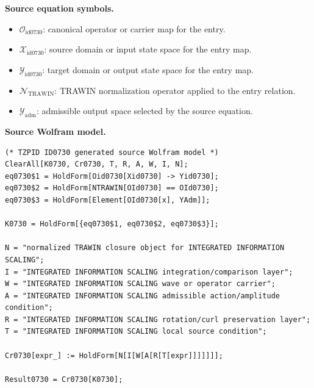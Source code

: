 \begin{minipage}[t]{0.49\linewidth}
\begingroup
\small
\raggedright
\textbf{Source equation symbols.}\par
\begin{itemize}[leftmargin=1.35em,itemsep=1pt,topsep=1pt,parsep=0pt]
    \item $\mathcal{O}_{\mathrm{id0730}}$: canonical operator or carrier map for the entry.
    \item $\mathcal{X}_{\mathrm{id0730}}$: source domain or input state space for the entry map.
    \item $\mathcal{Y}_{\mathrm{id0730}}$: target domain or output state space for the entry map.
    \item $\mathcal{N}_{\mathrm{TRAWIN}}$: TRAWIN normalization operator applied to the entry relation.
    \item $\mathcal{Y}_{\mathrm{adm}}$: admissible output space selected by the source equation.
\end{itemize}
\endgroup
\end{minipage}\hfill
\begin{minipage}[t]{0.47\linewidth}
\begingroup
\scriptsize
\raggedright
\textbf{Source Wolfram model.}\par
\begin{Verbatim}[fontsize=\tiny,breaklines=true,breakanywhere=true]
(* TZPID ID0730 generated source Wolfram model *)
ClearAll[K0730, Cr0730, T, R, A, W, I, N];
eq0730$1 = HoldForm[Oid0730[Xid0730] -> Yid0730];
eq0730$2 = HoldForm[NTRAWIN[OId0730] == OId0730];
eq0730$3 = HoldForm[Element[OId0730[x], YAdm]];

K0730 = HoldForm[{eq0730$1, eq0730$2, eq0730$3}];

N = "normalized TRAWIN closure object for INTEGRATED INFORMATION SCALING";
I = "INTEGRATED INFORMATION SCALING integration/comparison layer";
W = "INTEGRATED INFORMATION SCALING wave or operator carrier";
A = "INTEGRATED INFORMATION SCALING admissible action/amplitude condition";
R = "INTEGRATED INFORMATION SCALING rotation/curl preservation layer";
T = "INTEGRATED INFORMATION SCALING local source condition";

Cr0730[expr_] := HoldForm[N[I[W[A[R[T[expr]]]]]]];

Result0730 = Cr0730[K0730];
\end{Verbatim}
\endgroup
\end{minipage}

